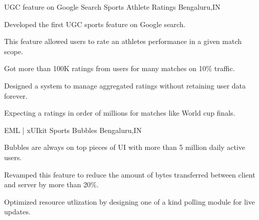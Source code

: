 


\begin{cventries}


\cventry
{UGC feature on Google Search} %
{Sports Athlete Ratings} %
{Bengaluru,IN} %
{} %
{ %
\begin{cvitems}
\item {Developed the first UGC sports feature on Google search.}
\item {This feature allowed users to rate an athletes performance in a given match scope.}
\item {Got more than 100K ratings from users for many matches on 10\% traffic.}
\item {Designed a system to manage aggregated ratings without retaining user data forever.}
\item {Expecting a ratings in order of millions for matches like World cup finals.}
\end{cvitems}
}


\cventry
{EML | xUIkit} %
{Sports Bubbles} %
{Bengaluru,IN} %
{} %
{ %
\begin{cvitems}
\item {Bubbles are always on top pieces of UI with more than 5 million daily active users.}
\item {Revamped this feature to reduce the amount of bytes transferred between client and server by more than 20\%.}
\item {Optimized resource utlization by designing one of a kind polling module for live updates.}
\end{cvitems}
}




\end{cventries}
